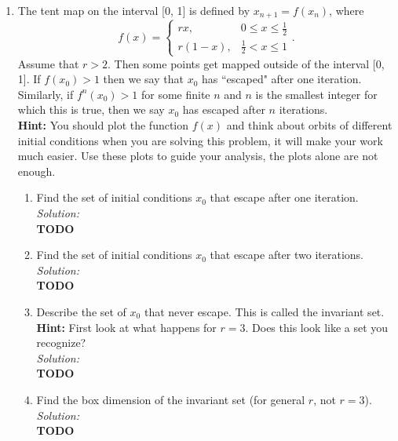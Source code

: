 \documentclass[10pt]{amsart}
\theoremstyle{nonumberplain}
\begin{document}
\begin{enumerate}[label={\bf {\arabic*}:}]
\item The tent map on the interval [0, 1] is defined by $x_{n + 1} = f(x_n)$, where 
$$
f(x) = \begin{cases}
rx,  &0 \leq x \leq \frac 1 2 \\
r(1 - x), &\frac 1 2 < x \leq 1
\end{cases}.
$$
Assume that $r > 2$.
Then some points get mapped outside of the interval [0, 1].
If $f(x_0) > 1$ then we say that $x_0$ has ``escaped" after one iteration.
Similarly, if $f^n(x_0) > 1$ for some finite $n$ and $n$ is the smallest integer for which this is true, then we say $x_0$ has escaped after $n$ iterations. \\
\textbf{Hint:} You should plot the function $f (x)$ and think about orbits of different initial
conditions when you are solving this problem, it will make your work much easier.
Use these plots to guide your analysis, the plots alone are not enough. \\

\begin{enumerate}
\item Find the set of initial conditions $x_0$ that escape after one iteration. \\

\textit{Solution:} \\
\textbf{TODO} \\

\item Find the set of initial conditions $x_0$ that escape after two iterations. \\

\textit{Solution:} \\
\textbf{TODO} \\


\item Describe the set of $x_0$ that never escape.
This is called the invariant set. \\
\textbf{Hint:} First look at what happens for $r = 3$.
Does this look like a set you recognize? \\

\textit{Solution:} \\
\textbf{TODO} \\

\item Find the box dimension of the invariant set (for general $r$, not $r = 3$). \\

\textit{Solution:} \\
\textbf{TODO} \\

\end{enumerate}

\end{enumerate}
\end{document}
